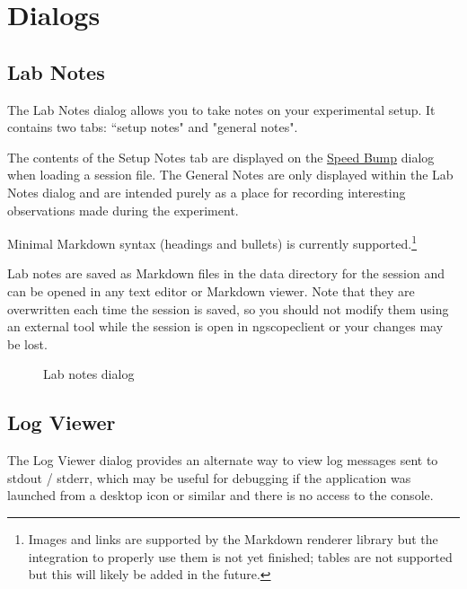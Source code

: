 \chapter{Dialogs}
\label{sec:dialogs}


\section{Lab Notes}
\label{dlg:labnotes}

The Lab Notes dialog allows you to take notes on your experimental setup. It contains two tabs: ``setup notes"
and "general notes".

The contents of the Setup Notes tab are displayed on the \hyperref[dlg:speedbump]{Speed Bump} dialog when loading a
session file. The General Notes are only displayed within the Lab Notes dialog and are intended purely as a place for
recording interesting observations made during the experiment.

Minimal Markdown syntax (headings and bullets) is currently supported.\footnote{Images and links are supported by the
Markdown renderer library but the integration to properly use them is not yet finished; tables are not supported but
this will likely be added in the future.}

Lab notes are saved as Markdown files in the data directory for the session and can be opened in any
text editor or Markdown viewer. Note that they are overwritten each time the session is saved, so you should not modify
them using an external tool while the session is open in ngscopeclient or your changes may be lost.

\begin{figure}[H]
\centering
{}
\caption{Lab notes dialog}
\label{fig:labnotes}
\end{figure}


\section{Log Viewer}
\label{dlg:logviewer}

The Log Viewer dialog provides an alternate way to view log messages sent to stdout / stderr, which may be useful for
debugging if the application was launched from a desktop icon or similar and there is no access to the console.

